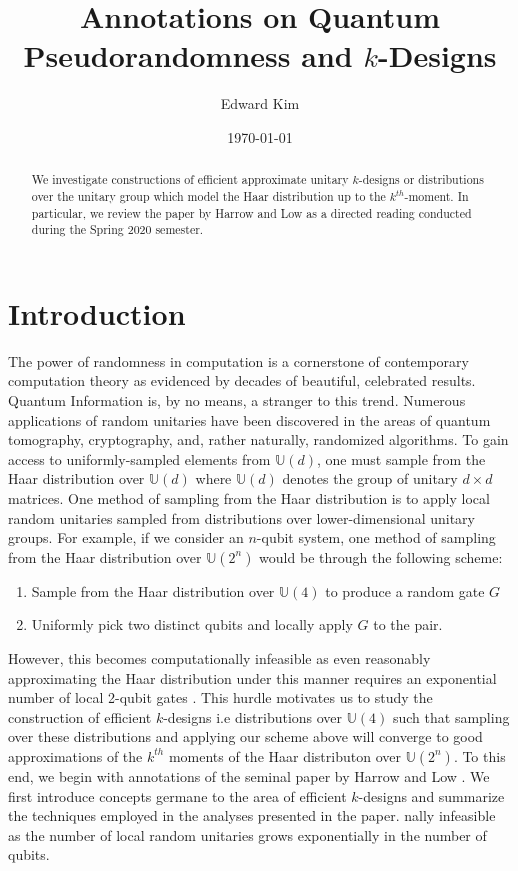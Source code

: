 \documentclass[12pt]{amsart}
\theoremstyle{definition}
\theoremstyle{remark}
\numberwithin{equation}{section}
\theoremstyle{remark}
\begin{document}
\title{Annotations on Quantum Pseudorandomness and $k$-Designs}
\author{Edward Kim}
\date{\today}
\maketitle

\begin{abstract}
  We investigate constructions of efficient approximate unitary $k$-designs or distributions over the unitary group which model the Haar distribution up to the $k^{th}$-moment. In particular, we review the paper by Harrow and Low as a directed reading conducted during the Spring 2020 semester.
\end{abstract}

\tableofcontents

\section{Introduction}

The power of randomness in computation is a cornerstone of contemporary computation theory as evidenced by decades of beautiful, celebrated results. Quantum Information is, by no means, a stranger to this trend. Numerous applications of random unitaries have been discovered in the areas of quantum tomography, cryptography, and, rather naturally, randomized algorithms. To gain access to uniformly-sampled elements from $\mathbb{U}(d)$, one must sample from the Haar distribution over $\mathbb{U}(d)$ where $\mathbb{U}(d)$ denotes the group of unitary $d \times d$ matrices. One method of sampling from the Haar distribution is to apply local random unitaries sampled from distributions over lower-dimensional unitary groups. For example, if we consider an $n$-qubit system, one method of sampling from the Haar distribution over $\mathbb{U}(2^n)$ would be through the following scheme:
\begin{enumerate}
  \item Sample from the Haar distribution over $\mathbb{U}(4)$ to produce a random gate $G$
  \item Uniformly pick two distinct qubits and locally apply $G$ to the pair.
\end{enumerate}
However, this becomes computationally infeasible as even reasonably approximating the Haar distribution under this manner requires an exponential number of local 2-qubit gates \cite{knill}. This hurdle motivates us to study the construction of efficient $k$-designs i.e distributions over $\mathbb{U}(4)$ such that sampling over these distributions and applying our scheme above will converge to good approximations of the $k^{th}$ moments of the Haar distributon over $\mathbb{U}(2^n)$. To this end, we begin with annotations of the seminal paper by Harrow and Low \cite{harrlow}. We first introduce concepts germane to the area of efficient $k$-designs and summarize the techniques employed in the analyses presented in the paper.
nally infeasible as the number of local random unitaries grows exponentially in the number of qubits.
\end{document}
